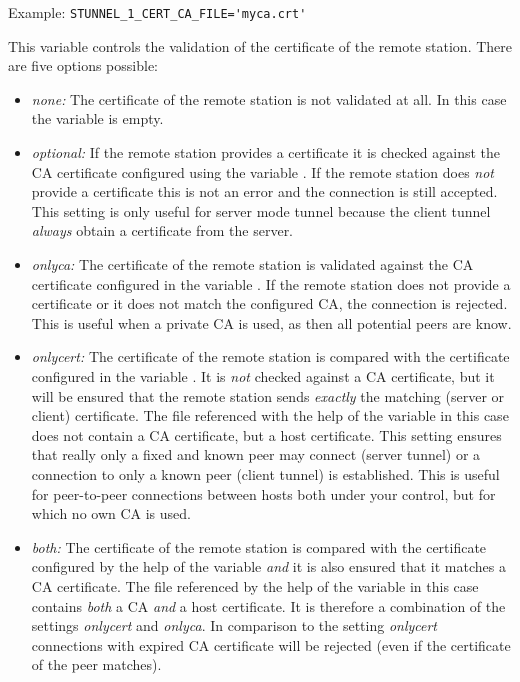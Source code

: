 \begin{description}
Example: \verb+STUNNEL_1_CERT_CA_FILE='myca.crt'+


This variable controls the validation of the certificate of the remote station.
There are five options possible:

\begin{itemize}
\item \emph{none:} The certificate of the remote station is not validated at all.
In this case the variable  is empty.

\item \emph{optional:} If the remote station provides a certificate it is checked
against the CA certificate configured using the variable .
If the remote station does \emph{not} provide a certificate this is not an error and the
connection is still accepted. This setting is only useful for server mode tunnel because
the client tunnel \emph{always} obtain a certificate from the server.

\item \emph{onlyca:} The certificate of the remote station is validated against
the CA certificate configured in the variable .
If the remote station does not provide a certificate or it does not match the
configured CA, the connection is rejected. This is useful when a private CA is used,
as then all potential peers are know.

\item \emph{onlycert:} The certificate of the remote station is compared with
the certificate configured in the variable .
It is \emph{not} checked against a CA certificate, but it will be ensured that
the remote station sends \emph{exactly} the matching (server or client) certificate.
The file referenced with the help of the variable 
in this case does not contain a CA certificate, but a host certificate. This setting
ensures that really only a fixed and known peer may connect (server tunnel) or
a connection to only a known peer (client tunnel) is established. This is useful for
peer-to-peer connections between hosts both under your control, but for which no
own CA is used.

\item \emph{both:} The certificate of the remote station is compared  with the
certificate configured by the help of the variable 
\emph{and} it is also ensured that it matches a CA certificate. The file referenced
by the help of the variable  in this case contains
\emph{both} a CA \emph{and} a host certificate. It is therefore a combination of
the settings \emph{onlycert} and \emph{onlyca}. In comparison to the setting
\emph{onlycert} connections with expired CA certificate will be rejected (even if the
certificate of the peer matches).


\end{itemize}
\end{description}
